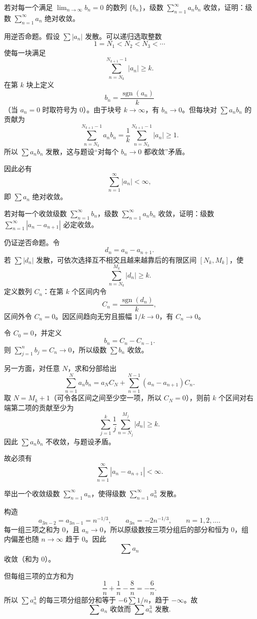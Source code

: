 \begin{xreferenceproblem}[11]
若对每一个满足 $\lim_{n\to\infty}b_n=0$ 的数列 $\{b_n\}$，级数 $\sum_{n=1}^{\infty}a_nb_n$ 收敛，证明：级数 $\sum_{n=1}^{\infty}a_n$ 绝对收敛。
\end{xreferenceproblem}
\begin{xsolution}
用逆否命题。假设 $\sum|a_n|$ 发散。可以递归选取整数
\[
 1=N_1<N_2<N_3<\cdots
\]
使每一块满足
\[
 \sum_{n=N_k}^{N_{k+1}-1}|a_n|\geq k.
\]
在第 $k$ 块上定义
\[
 b_n=\frac{\operatorname{sgn}(a_n)}{k}
\]
（当 $a_n=0$ 时取符号为 $0$）。由于块号 $k\to\infty$，有 $b_n\to0$。但每块对 $\sum a_nb_n$ 的贡献为
\[
 \sum_{n=N_k}^{N_{k+1}-1}a_nb_n
 =\frac1k\sum_{n=N_k}^{N_{k+1}-1}|a_n|\geq1.
\]
所以 $\sum a_nb_n$ 发散，这与题设“对每个 $b_n\to0$ 都收敛”矛盾。

因此必有
\[
 \boxed{\sum_{n=1}^{\infty}|a_n|<\infty},
\]
即 $\sum a_n$ 绝对收敛。
\end{xsolution}


\begin{xreferenceproblem}[12]
若对每一个收敛级数 $\sum_{n=1}^{\infty}b_n$，级数 $\sum_{n=1}^{\infty}a_nb_n$ 收敛，证明：级数 $\sum_{n=1}^{\infty}|a_n-a_{n+1}|$ 必定收敛。
\end{xreferenceproblem}
\begin{xsolution}
仍证逆否命题。令
\[
 d_n=a_n-a_{n+1}.
\]
若 $\sum|d_n|$ 发散，可依次选择互不相交且越来越靠后的有限区间 $[N_k,M_k]$，使
\[
 \sum_{n=N_k}^{M_k}|d_n|\geq k.
\]
定义数列 $C_n$：在第 $k$ 个区间内令
\[
 C_n=\frac{\operatorname{sgn}(d_n)}{k},
\]
区间外令 $C_n=0$。因区间趋向无穷且振幅 $1/k\to0$，有 $C_n\to0$。

令 $C_0=0$，并定义
\[
 b_n=C_n-C_{n-1}.
\]
则 $\sum_{j=1}^{n}b_j=C_n\to0$，所以级数 $\sum b_n$ 收敛。

另一方面，对任意 $N$，求和分部给出
\[
 \sum_{n=1}^{N}a_nb_n
 =a_NC_N+\sum_{n=1}^{N-1}(a_n-a_{n+1})C_n.
\]
取 $N=M_k+1$（可令各区间之间至少空一项，所以 $C_N=0$），则前 $k$ 个区间对右端第二项的贡献至少为
\[
 \sum_{j=1}^{k}\frac1j\sum_{n=N_j}^{M_j}|d_n|\geq k.
\]
因此 $\sum a_nb_n$ 不收敛，与题设矛盾。

故必须有
\[
 \boxed{\sum_{n=1}^{\infty}|a_n-a_{n+1}|<\infty}.
\]
\end{xsolution}


\begin{xreferenceproblem}[13]
举出一个收敛级数 $\sum_{n=1}^{\infty}a_n$，使得级数 $\sum_{n=1}^{\infty}a_n^3$ 发散。
\end{xreferenceproblem}
\begin{xsolution}
构造
\[
 a_{3n-2}=a_{3n-1}=n^{-1/3},
 \qquad
 a_{3n}=-2n^{-1/3},
 \qquad n=1,2,\ldots.
\]
每一组三项之和为 $0$，且 $a_n\to0$，所以原级数按三项分组后的部分和恒为 $0$，组内偏差也随 $n\to\infty$ 趋于 $0$。因此
\[
 \sum a_n
\]
收敛（和为 $0$）。

但每组三项的立方和为
\[
 \frac1n+\frac1n-\frac8n=-\frac6n.
\]
所以 $\sum a_n^3$ 的每三项分组部分和等于 $-6\sum1/n$，趋于 $-\infty$。故
\[
 \boxed{\sum a_n\text{ 收敛而 }\sum a_n^3\text{ 发散}.}
\]
\end{xsolution}


